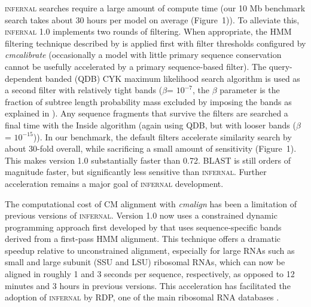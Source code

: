 \textsc{infernal} searches require a large amount of compute time (our
10 Mb benchmark search takes about 30 hours per model on average
(Figure~1)). To alleviate this, \textsc{infernal} 1.0 implements two
rounds of filtering.  When appropriate, the HMM filtering technique
described by \citet{WeinbergRuzzo06} is applied first with filter
thresholds configured by \emph{cmcalibrate} (occasionally a model with
little primary sequence conservation cannot be usefully accelerated by
a primary sequence-based filter).  The query-dependent banded (QDB)
CYK maximum likelihood search algorithm is used as a second filter
with relatively tight bands ($\beta$= $10^{-7}$, the $\beta$ parameter
is the fraction of subtree length probability mass excluded by
imposing the bands as explained in \citep{NawrockiEddy07}).  Any
sequence fragments that survive the filters are searched a final time
with the Inside algorithm (again using QDB, but with looser bands
($\beta$= $10^{-15}$)).  In our benchmark, the default filters
accelerate similarity search by about 30-fold overall, while
sacrificing a small amount of sensitivity (Figure~1). This makes
version 1.0 substantially faster than 0.72. \textsc{BLAST} is still
orders of magnitude faster, but significantly less sensitive than
\textsc{infernal}. Further acceleration remains a major goal of
\textsc{infernal} development.

The computational cost of CM alignment with \emph{cmalign} has been a
limitation of previous versions of \textsc{infernal}. Version 1.0 now
uses a constrained dynamic programming approach first developed by
\citet{Brown00} that uses sequence-specific bands derived from a
first-pass HMM alignment. This technique offers a dramatic speedup
relative to unconstrained alignment, especially for large RNAs such as
small and large subunit (SSU and LSU) ribosomal RNAs, which can now be
aligned in roughly 1 and 3 seconds per sequence, respectively, as
opposed to 12 minutes and 3 hours in previous versions.  This
acceleration has facilitated the adoption of \textsc{infernal} by RDP,
one of the main ribosomal RNA databases \citep{Cole09}.


